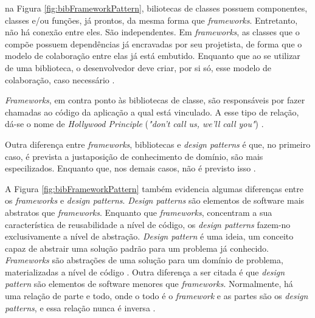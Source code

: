 na Figura \ref{fig:bibFrameworkPattern}, biliotecas de classes possuem
componentes, classes e/ou funções, já prontos, da mesma forma que
\textit{frameworks}. Entretanto, não há conexão entre eles. São independentes.
Em \textit{frameworks}, as classes que o compõe possuem dependências já
encravadas por seu projetista, de forma que o modelo de colaboração entre elas
já está embutido. Enquanto que ao se utilizar de uma biblioteca, o desenvolvedor
deve criar, por si só, esse modelo de colaboração, caso necessário
\cite{barretoJunior2006}.
\par
\indent \textit{Frameworks}, em contra ponto às bibliotecas de classe, são
responsáveis por fazer chamadas ao código da aplicação a qual está vinculado.
A esse tipo de relação, dá-se o nome de \textit{Hollywood Principle}
(\textit{"don't call us, we'll call you"}) \cite{sauve2006}.
\par
\indent Outra diferença entre \textit{frameworks}, bibliotecas e
\textit{design patterns} é que, no  primeiro caso, é prevista a justaposição de
conhecimento de domínio, são mais especilizados. Enquanto que, nos demais casos,
não é previsto isso \cite{sauve2006}.
\par
\indent A Figura  \ref{fig:bibFrameworkPattern} também evidencia algumas
diferenças entre os \textit{frameworks} e \textit{design patterns}.
\textit{Design patterns} são elementos de software mais abstratos que
\textit{frameworks}. Enquanto que \textit{frameworks}, concentram a sua
característica de reusabilidade a nível de código, os \textit{design patterns}
fazem-no exclusivamente a nível de abstração. \textit{Design pattern} é uma
ideia, um conceito capaz de abstrair uma solução padrão para um problema já
conhecido. \textit{Frameworks} são abstrações de uma solução para um domínio de
problema, materializadas a nível de código \cite{sauve2006}. Outra diferença a
ser citada é que \textit{design pattern} são elementos de software menores que
\textit{frameworks}. Normalmente, há uma relação de parte e todo, onde o todo é
o \textit{framework} e as partes são os \textit{design patterns}, e essa
relação nunca é inversa \cite{sauve2006}.

